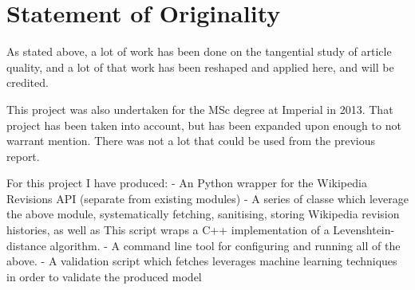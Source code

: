 \section{Statement of Originality}

As stated above, a lot of work has been done on the tangential study
of article quality, and a lot of that work has been reshaped and
applied here, and will be credited.

This project was also undertaken for the MSc degree at Imperial in
2013. That project has been taken into account, but has been expanded
upon enough to not warrant mention. There was not a lot that could be
used from the previous report.

For this project I have produced:
 - An Python wrapper for the Wikipedia Revisions API (separate from
 existing modules)
 - A series of classe which leverage the above module, systematically
 fetching, sanitising, storing Wikipedia revision
 histories, as well as  This script wraps a C++ implementation
 of a Levenshtein-distance algorithm.  
 - A command line tool for configuring and running all of the above. 
 - A validation script which fetches leverages machine learning techniques
 in order to validate the produced model
